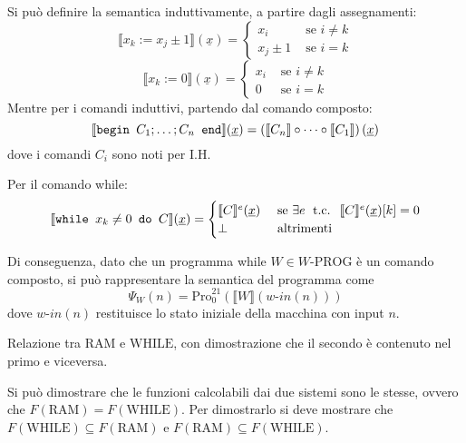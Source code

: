 \documentclass[12pt, answers]{exam}
\theoremstyle{plain}
\newcommand{\tc}{\; \text{ t.c. } \;}
\newcommand{\ram}{\text{RAM}}
\newcommand{\while}{\text{WHILE}}
\newcommand{\wprog}{W\text{-PROG}}
\newcommand{\pro}{\text{Pro}}
\newcommand{\win}{w\text{-}in}
\begin{document}
\begin{questions}
\begin{solution}
            Si può definire la semantica induttivamente, a partire dagli assegnamenti: 
            $$
            \llbracket x_k := x_j \pm 1 \rrbracket (\underline{x}) = \begin{cases}
                x_i & \text{ se } i \neq k \\
                x_j \pm 1 & \text{ se } i = k
            \end{cases}
            $$
            $$
            \llbracket x_k := 0 \rrbracket (\underline{x}) = \begin{cases}
                x_i & \text{ se } i \neq k \\
                0 & \text{ se } i  = k
            \end{cases}
            $$
            Mentre per i comandi induttivi, partendo dal comando composto: 
            $$ \llbracket \text{\texttt{begin }} C_1; \dots; C_n \text{\texttt{ end}}\rrbracket (\underline{x}) = \left(\llbracket C_n \rrbracket \circ \dots \circ \llbracket C_1 \rrbracket \right) (\underline{x}) $$
            dove i comandi $C_i$ sono noti per I.H. 
            
            Per il comando while: 
            $$
            \llbracket \text{\texttt{while }} x_k \neq 0 \text{\texttt{ do }} C \rrbracket (\underline{x}) = \begin{cases}
                \llbracket C \rrbracket^e (\underline{x}) & \text{ se } \exists e \tc \llbracket C \rrbracket^e (\underline{x}) [k] = 0 \\
                \bot & \text{ altrimenti}
            \end{cases}
            $$
            
            Di conseguenza, dato che un programma while $W \in \wprog$ è un comando composto, si può rappresentare la semantica del programma come
            $$ \Psi_W (n) = \pro^{21}_0 \left(\llbracket W \rrbracket (\win(n))\right) $$
            dove $\win (n)$ restituisce lo stato iniziale della macchina con input $n$.
        \end{solution}
        
        \question Relazione tra $\ram$ e $\while$, con dimostrazione che il secondo è contenuto nel primo e viceversa.
        
        \begin{solution}
            Si può dimostrare che le funzioni calcolabili dai due sistemi sono le stesse, ovvero che $F(\ram) = F(\while)$. Per dimostrarlo si deve mostrare che $F(\while) \subseteq F(\ram)$ e $F(\ram) \subseteq F(\while)$.
            

\end{solution}
\end{questions}
\end{document}
